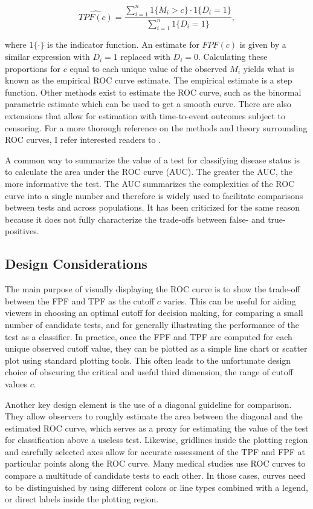 \documentclass[article]{jss}
\begin{document}
\[ \widehat{TPF(c)} = \frac{\sum_{i = 1}^n 1\{M_i > c\} \cdot 1\{D_i = 1\}}{\sum_{i=1}^n 1\{D_i = 1\}}, \]

where \(1\{\cdot\}\) is the indicator function. An estimate for
\(FPF(c)\) is given by a similar expression with \(D_i = 1\) replaced
with \(D_i = 0\). Calculating these proportions for \(c\) equal to each
unique value of the observed \(M_i\) yields what is known as the
empirical ROC curve estimate. The empirical estimate is a step function.
Other methods exist to estimate the ROC curve, such as the binormal
parametric estimate which can be used to get a smooth curve. There are
also extensions that allow for estimation with time-to-event outcomes
subject to censoring. For a more thorough reference on the methods and
theory surrounding ROC curves, I refer interested readers to
\citet{pepe2003statistical}.

A common way to summarize the value of a test for classifying disease
status is to calculate the area under the ROC curve (AUC). The greater
the AUC, the more informative the test. The AUC summarizes the
complexities of the ROC curve into a single number and therefore is
widely used to facilitate comparisons between tests and across
populations. It has been criticized for the same reason because it does
not fully characterize the trade-offs between false- and true-positives.

\subsection{Design Considerations}\label{design-considerations}

The main purpose of visually displaying the ROC curve is to show the
trade-off between the FPF and TPF as the cutoff \(c\) varies. This can
be useful for aiding viewers in choosing an optimal cutoff for decision
making, for comparing a small number of candidate tests, and for
generally illustrating the performance of the test as a classifier. In
practice, once the FPF and TPF are computed for each unique observed
cutoff value, they can be plotted as a simple line chart or scatter plot
using standard plotting tools. This often leads to the unfortunate
design choice of obscuring the critical and useful third dimension, the
range of cutoff values \(c\).

Another key design element is the use of a diagonal guideline for
comparison. They allow observers to roughly estimate the area between
the diagonal and the estimated ROC curve, which serves as a proxy for
estimating the value of the test for classification above a useless
test. Likewise, gridlines inside the plotting region and carefully
selected axes allow for accurate assessment of the TPF and FPF at
particular points along the ROC curve. Many medical studies use ROC
curves to compare a multitude of candidate tests to each other. In those
cases, curves need to be distinguished by using different colors or line
types combined with a legend, or direct labels inside the plotting
region.
\end{document}
